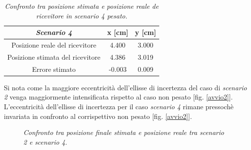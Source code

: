 \documentclass[a4paper,11pt,twoside]{book}
\begin{document}
\begin{table}[H]
	\begin{center}
		\begin{tabular}{|c|c|c|}
			\hline
			\textsl{Scenario 4} &  x [cm] & y [cm] \\
			\hline
			Posizione reale del ricevitore & 4.400 & 3.000 \\
			\hline
			Posizione stimata del ricevitore & 4.386 & 3.019 \\
			\hline
			Errore stimato & -0.003 & 0.009 \\
			\hline
		\end{tabular}
		\caption{\textit{Confronto tra posizione stimata e posizione reale de ricevitore in \textsl{scenario 4} pesato.}}
		\label{tab4}
	\end{center}	
\end{table}

	Si nota come la maggiore eccentricità dell'ellisse di incertezza del caso di \textsl{scenario 2} venga maggiormente intensificata rispetto al caso non pesato [fig. \ref{avvio2}]. L'eccentricità dell'ellisse di incertezza per il caso \textsl{scenario 4} rimane pressochè invariata in confronto al corrispettivo non pesato [fig. \ref{avvio2}].
	
	\begin{figure}[H]
		\centering
		\qquad
		\vspace{-0.3cm}
		\caption{\textit{Confronto tra posizione finale stimata e posizione reale tra \textsl{scenario 2} e \textsl{scenario 4}.}}
		\label{avvio3}
	\end{figure}
\end{document}
